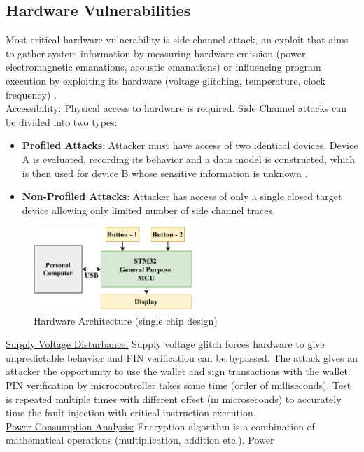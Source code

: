 \documentclass[conference]{IEEEtran}
\begin{document}
\subsection{Hardware Vulnerabilities}
Most critical hardware vulnerability is side channel attack, an exploit that aims to gather system information by measuring hardware emission 
(power, electromagnetic emanations, acoustic emanations) or influencing program execution by exploiting its hardware (voltage glitching, 
temperature, clock frequency) \cite{san2019side}.\\
\underline{Accessibility:} Physical access to hardware is required. Side Channel attacks can be divided into two types: 
\begin{itemize}
    \item \textbf{Profiled Attacks}: Attacker must have access of two identical devices. Device A is evaluated, recording its behavior and a 
    data model is constructed, which is then used for device B whose sensitive information is unknown \cite{san2019side}. 
    \item \textbf{Non-Profiled Attacks}: Attacker has access of only a single closed target device allowing only limited number of side 
    channel traces\cite{timon2019non}.  
\end{itemize}
\begin{figure}[t]
    \centering
    \includegraphics[width=60mm]{Figures/singleMCU.pdf}
    \caption{Hardware Architecture (single chip design)}
    \label{fig3}
\end{figure}
\underline{Supply Voltage Disturbance:} Supply voltage glitch forces hardware to give unpredictable behavior and PIN verification can be 
bypassed. The attack gives an attacker the opportunity to use the wallet and sign transactions with the wallet. PIN verification by microcontroller 
takes some time (order of milliseconds). Test is repeated multiple times with different offset (in microseconds) to accurately time the fault 
injection with critical instruction execution. \\
\underline{Power Consumption Analysis:} Encryption algorithm is a combination of mathematical operations (multiplication, addition etc.). Power 
\end{document}
